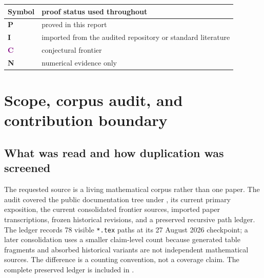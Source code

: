 \documentclass[11pt,oneside]{article}
\theoremstyle{definition}
\theoremstyle{remark}
\newcommand{\statusP}{\textcolor{deepgreen}{\textbf{P}}}
\newcommand{\statusI}{\textcolor{deepblue}{\textbf{I}}}
\newcommand{\statusC}{\textcolor{purple}{\textbf{C}}}
\newcommand{\statusN}{\textcolor{deepred}{\textbf{N}}}
\begin{document}
\begin{abstract}
All assertions marked proved are supplied with proofs.  Numerical tables and
figures are reproducible from the fully commented Python program included in
the archive.  ``New'' always means not located in the audited repository
corpus and screened prior packages; no unconditional claim of worldwide
historical priority is made.
\end{abstract}

\begin{center}
\begin{tabular}{@{}ll@{}}
\toprule
Symbol & proof status used throughout \\
\midrule
\statusP & proved in this report \\
\statusI & imported from the audited repository or standard literature \\
\statusC & conjectural frontier \\
\statusN & numerical evidence only \\
\bottomrule
\end{tabular}
\end{center}

\tableofcontents
\clearpage

\section{Scope, corpus audit, and contribution boundary}
\label{sec:scope}

\subsection{What was read and how duplication was screened}

The requested source is a living mathematical corpus rather than one paper.
The audit covered the public documentation tree under
, its current primary exposition, the
current consolidated frontier sources, imported paper transcriptions, frozen
historical revisions, and a preserved recursive path ledger.  The ledger
records 78 visible \texttt{*.tex} paths at its 27 August 2026 checkpoint; a
later consolidation uses a smaller claim-level count because generated table
fragments and absorbed historical variants are not independent mathematical
sources.  The difference is a counting convention, not a coverage claim.
The complete preserved ledger is included in
.
\end{document}
